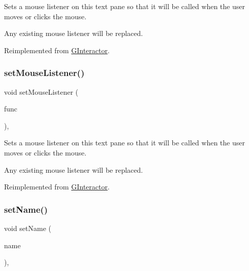 Sets a mouse listener on this text pane so that it will be called when the user moves or clicks the mouse. 

Any existing mouse listener will be replaced. 

Reimplemented from \mbox{\hyperlink{classGInteractor_a37d8dbc943f59920f705b0104f60bde2}{G\+Interactor}}.

\mbox{\label{classGBrowserPane_a3ed42c5f929cba378927916dd73e6576}} 
\subsubsection{\texorpdfstring{set\+Mouse\+Listener()}{setMouseListener()}\hspace{0.1cm}{\footnotesize\ttfamily [2/2]}}
{\footnotesize\ttfamily void set\+Mouse\+Listener (\begin{DoxyParamCaption}\item[{G\+Event\+Listener\+Void}]{func }\end{DoxyParamCaption})\hspace{0.3cm}{\ttfamily [override]}, {\ttfamily [virtual]}}



Sets a mouse listener on this text pane so that it will be called when the user moves or clicks the mouse. 

Any existing mouse listener will be replaced. 

Reimplemented from \mbox{\hyperlink{classGInteractor_aea7f647ea62d59f71b5fad6aa65eeaf9}{G\+Interactor}}.

\mbox{\label{classGInteractor_a9d3a2685df23b5e7cbf59c19c4a1f9b5}} 
\subsubsection{\texorpdfstring{set\+Name()}{setName()}}
{\footnotesize\ttfamily void set\+Name (\begin{DoxyParamCaption}\item[{const std\+::string \&}]{name }\end{DoxyParamCaption})\hspace{0.3cm}{\ttfamily [virtual]}, {\ttfamily [inherited]}}



